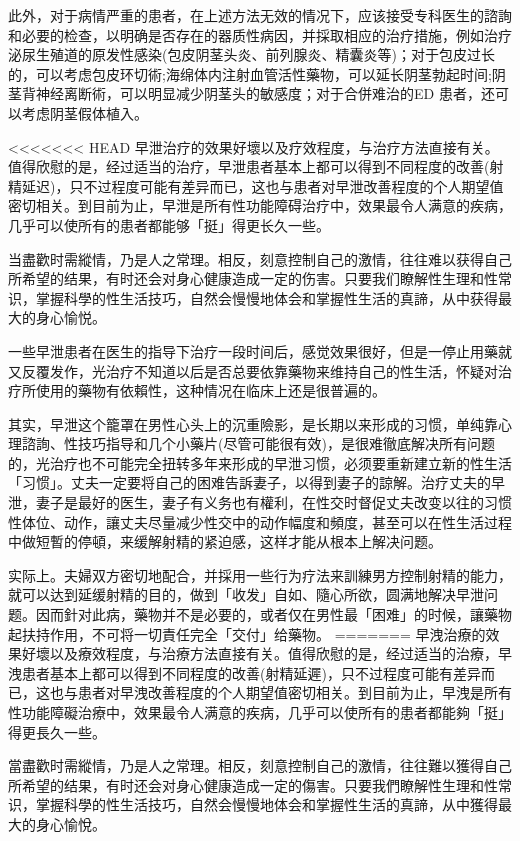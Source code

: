 \documentclass[12pt,UTF8]{ctexbook}
\begin{document}
此外，对于病情严重的患者，在上述方法无效的情况下，应该接受专科医生的諮詢和必要的检查，以明确是否存在的器质性病因，并採取相应的治疗措施，例如治疗泌尿生殖道的原发性感染(包皮阴茎头炎、前列腺炎、精囊炎等)；对于包皮过长的，可以考虑包皮环切術;海绵体内注射血管活性藥物，可以延长阴茎勃起时间;阴茎背神经离断術，可以明显减少阴茎头的敏感度；对于合併难治的ED 患者，还可以考虑阴茎假体植入。

<<<<<<< HEAD
早泄治疗的效果好壞以及疗效程度，与治疗方法直接有关。值得欣慰的是，经过适当的治疗，早泄患者基本上都可以得到不同程度的改善(射精延迟)，只不过程度可能有差异而已，这也与患者对早泄改善程度的个人期望值密切相关。到目前为止，早泄是所有性功能障碍治疗中，效果最令人满意的疾病，几乎可以使所有的患者都能够「挺」得更长久一些。

当盡歡时需縱情，乃是人之常理。相反，刻意控制自己的激情，往往难以获得自己所希望的结果，有时还会对身心健康造成一定的伤害。只要我们瞭解性生理和性常识，掌握科學的性生活技巧，自然会慢慢地体会和掌握性生活的真諦，从中获得最大的身心愉悦。

一些早泄患者在医生的指导下治疗一段时间后，感觉效果很好，但是一停止用藥就又反覆发作，光治疗不知道以后是否总要依靠藥物来维持自己的性生活，怀疑对治疗所使用的藥物有依賴性，这种情况在临床上还是很普遍的。

其实，早泄这个籠罩在男性心头上的沉重險影，是长期以来形成的习惯，单纯靠心理諮詢、性技巧指导和几个小藥片(尽管可能很有效)，是很难徹底解决所有问题的，光治疗也不可能完全扭转多年来形成的早泄习惯，必须要重新建立新的性生活「习惯」。丈夫一定要将自己的困难告訴妻子，以得到妻子的諒解。治疗丈夫的早泄，妻子是最好的医生，妻子有义务也有權利，在性交时督促丈夫改变以往的习惯性体位、动作，讓丈夫尽量减少性交中的动作幅度和頻度，甚至可以在性生活过程中做短暫的停頓，来缓解射精的紧迫感，这样才能从根本上解决问题。

实际上。夫婦双方密切地配合，并採用一些行为疗法来訓練男方控制射精的能力，就可以达到延缓射精的目的，做到「收发」自如、隨心所欲，圆满地解决早泄问题。因而針对此病，藥物并不是必要的，或者仅在男性最「困难」的时候，讓藥物起扶持作用，不可将一切責任完全「交付」给藥物。
=======
早洩治療的效果好壞以及療效程度，与治療方法直接有关。值得欣慰的是，经过适当的治療，早洩患者基本上都可以得到不同程度的改善(射精延遲)，只不过程度可能有差异而已，这也与患者对早洩改善程度的个人期望值密切相关。到目前为止，早洩是所有性功能障礙治療中，效果最令人满意的疾病，几乎可以使所有的患者都能夠「挺」得更長久一些。

當盡歡时需縱情，乃是人之常理。相反，刻意控制自己的激情，往往難以獲得自己所希望的结果，有时还会对身心健康造成一定的傷害。只要我們瞭解性生理和性常识，掌握科學的性生活技巧，自然会慢慢地体会和掌握性生活的真諦，从中獲得最大的身心愉悅。
\end{document}

